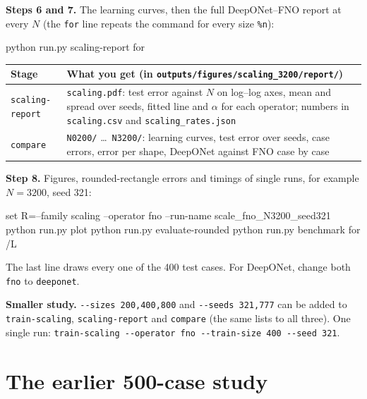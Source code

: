 \documentclass[11pt,a4paper]{article}
\newcommand{\code}[1]{\lstinline{#1}}
\begin{document}
\textbf{Steps 6 and 7.} The learning curves, then the full DeepONet--FNO report at every $N$
(the \code{for} line repeats the command for every size \texttt{\%n}):

\begin{cmd}
python run.py scaling-report
for %
\end{cmd}

\begin{center}
\begin{tabularx}{\textwidth}{@{}lY@{}}
\toprule
Stage & What you get (in \code{outputs/figures/scaling_3200/report/}) \\
\midrule
\code{scaling-report} & \code{scaling.pdf}: test error against $N$ on log--log axes, mean and
                        spread over seeds, fitted line and $\alpha$ for each operator;
                        numbers in \code{scaling.csv} and \code{scaling_rates.json} \\
\code{compare}        & \code{N0200/} \ldots\ \code{N3200/}: learning curves, test error over seeds,
                        case errors, error per shape, DeepONet against FNO case by case \\
\bottomrule
\end{tabularx}
\end{center}

\textbf{Step 8.} Figures, rounded-rectangle errors and timings of single runs, for example
$N = 3200$, seed 321:

\begin{cmd}
set R=--family scaling --operator fno --run-name scale_fno_N3200_seed321
python run.py plot             %
python run.py evaluate-rounded %
python run.py benchmark        %
for /L %
\end{cmd}

The last line draws every one of the 400 test cases. For DeepONet, change both \code{fno} to
\code{deeponet}.

\textbf{Smaller study.} \code{--sizes 200,400,800} and \code{--seeds 321,777} can be added to
\code{train-scaling}, \code{scaling-report} and \code{compare} (the same lists to all three).
One single run: \code{train-scaling --operator fno --train-size 400 --seed 321}.

\section{The earlier 500-case study}\label{sec:pcfinal}
\end{document}
